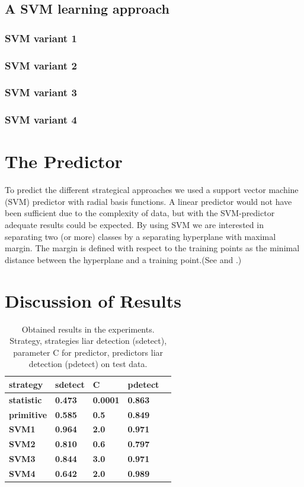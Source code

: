 \documentclass[11pt]{article}
\begin{document}
\subsection{A SVM learning approach}
\subsubsection{SVM variant 1}
\subsubsection{SVM variant 2}
\subsubsection{SVM variant 3}
\subsubsection{SVM variant 4}

\section{The Predictor}
To predict the different strategical approaches we used a support vector machine (SVM) predictor with radial basis functions. A linear predictor would not have been sufficient due to the complexity of data, but with the SVM-predictor adequate results could be expected.
By using SVM we are interested in separating two (or more) classes by a separating hyperplane with maximal margin. The margin is defined with respect to the training points as the minimal distance between the hyperplane and a training point.(See \cite{luxburg:2016} and \cite[187--227]{Schoellkopf:02}.)

\section{Discussion of Results}
\begin{table}[H]
\centering
\small
\begin{tabular}{|l|l|l|l|l|}

\hline
\textbf{strategy}&\textbf{sdetect}&\textbf{C}&\textbf{pdetect} \\ \hline
\textbf{statistic}&\textbf{0.473}&\textbf{0.0001}&\textbf{0.863} \\ \hline
\textbf{primitive}&\textbf{0.585}&\textbf{0.5}&\textbf{0.849} \\ \hline
\textbf{SVM1}&\textbf{0.964}&\textbf{2.0}&\textbf{0.971} \\ \hline
\textbf{SVM2}&\textbf{0.810}&\textbf{0.6}&\textbf{0.797}\\ \hline 
\textbf{SVM3}&\textbf{0.844}&\textbf{3.0}&\textbf{0.971}\\ \hline 
\textbf{SVM4}&\textbf{0.642}&\textbf{2.0}&\textbf{0.989} \\ \hline


\end{tabular}
\caption{Obtained results in the experiments. Strategy, strategies liar detection (sdetect), parameter C for predictor, predictors liar detection (pdetect) on test data.}
\label{tab:accents}
\end{table}
\end{document}

